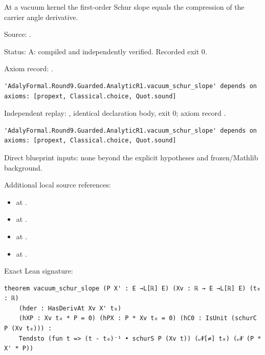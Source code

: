 \begin{theorem}[bp-083]
\label{bp-083}
\uses{}
\leanok
At a vacuum kernel the first-order Schur slope equals the compression of the carrier angle derivative.

\par Source: \texttt{}.
\par Status: A: compiled and independently verified. Recorded exit 0.
\par Axiom record: \texttt{}.
\begin{verbatim}
'AdalyFormal.Round9.Guarded.AnalyticR1.vacuum_schur_slope' depends on axioms: [propext, Classical.choice, Quot.sound]
\end{verbatim}
\par Independent replay: \texttt{}, identical declaration body, exit 0; axiom record \texttt{}.
\begin{verbatim}
'AdalyFormal.Round9.Guarded.AnalyticR1.vacuum_schur_slope' depends on axioms: [propext, Classical.choice, Quot.sound]
\end{verbatim}
\par Direct blueprint inputs: none beyond the explicit hypotheses and frozen/Mathlib background.
\par Additional local source references:
\begin{itemize}
\item \texttt{} at \texttt{}.
\item \texttt{} at \texttt{}.
\item \texttt{} at \texttt{}.
\item \texttt{} at \texttt{}.
\end{itemize}
\par Exact Lean signature:
\begin{verbatim}
theorem vacuum_schur_slope (P X' : E →L[ℝ] E) (Xv : ℝ → E →L[ℝ] E) (t₀ : ℝ)
    (hder : HasDerivAt Xv X' t₀)
    (hXP : Xv t₀ * P = 0) (hPX : P * Xv t₀ = 0) (hC0 : IsUnit (schurC P (Xv t₀))) :
    Tendsto (fun t => (t - t₀)⁻¹ • schurS P (Xv t)) (𝓝[≠] t₀) (𝓝 (P * X' * P))
\end{verbatim}
\end{theorem}

